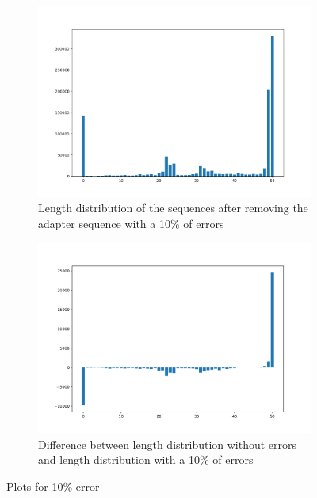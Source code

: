 \documentclass[a4paper,10pt]{article}
\begin{document}
\begin{figure}[H]
    \centering
    \begin{subfigure}[b]{1\textwidth}
       \includegraphics[width=12cm]{images/length-distr-10.png}
       \caption{Length distribution of the sequences after removing the adapter sequence with a 10\% of errors}
       \label{fig:10} 
    \end{subfigure}
    
    \begin{subfigure}[b]{1\textwidth}
       \includegraphics[width=12cm]{images/length-distr-length-distr-10.png}
       \caption{Difference between length distribution without errors and length distribution with a 10\% of errors}
       \label{fig:diff10}
    \end{subfigure}
    
    \caption{Plots for 10\% error}
\end{figure}
\end{document}
